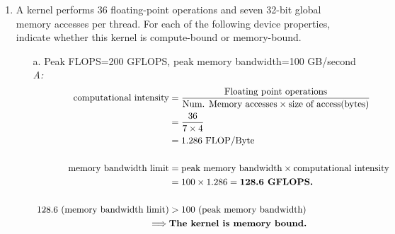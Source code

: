 \begin{enumerate}
      \item A kernel performs 36 floating-point operations and seven 32-bit global memory accesses per thread. For each of the following device properties, indicate whether this kernel is compute-bound or memory-bound.
            \begin{itemize}
                  \item[ a.] Peak FLOPS=200 GFLOPS, peak memory bandwidth=100 GB/second
                        \\ \textsl{A:}
                        \begin{equation*}
                              \begin{aligned}
                                    \text{computational intensity}         & = \frac{\text{Floating point operations} }{\text{Num. Memory accesses} \times  \text{\text{size of access(bytes)}}} \\
                                                                           & = \frac{36}{7\times4}                                                                                               \\
                                                                           & = 1.286 \text{ FLOP/Byte}                                                                                           \\\\
                                    \text{memory bandwidth limit}          & = \text{peak memory bandwidth}                 \times \text{computational intensity}                                \\
                                                                           & = 100 \times 1.286 = \textbf{128.6 GFLOPS.}                                                                         \\\\
                                    \text{ 128.6 (memory bandwidth limit)} & > \text{100 (peak memory bandwidth)}                                                                                \\
                                    \implies                               & \textbf{The kernel is memory bound.}                                                                                \\
                              \end{aligned}
                        \end{equation*}

\end{itemize}
\end{enumerate}
